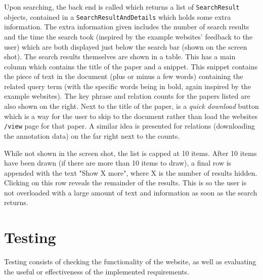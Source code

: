 Upon searching, the back end is called which returns a list of \texttt{SearchResult} objects, contained in a \texttt{SearchResultAndDetails} which holds some extra information. The extra information given includes the number of search results and the time the search took (inspired by the example websites' feedback to the user) which are both displayed just below the search bar (shown on the screen shot). The search results themselves are shown in a table. This has a main column which contains the title of the paper and a snippet. This snippet contains the piece of text in the document (plus or minus a few words) containing the related query term (with the specific words being in bold, again inspired by the example websites). The key phrase and relation counts for the papers listed are also shown on the right. Next to the title of the paper, is a \textit{quick download} button which is a way for the user to skip to the document rather than load the websites \texttt{/view} page for that paper. A similar idea is presented for relations (downloading the annotation data) on the far right next to the counts.

While not shown in the screen shot, the list is capped at 10 items. After 10 items have been drawn (if there are more than 10 items to draw), a final row is appended with the text "Show X more", where X is the number of results hidden. Clicking on this row reveals the remainder of the results. This is so the user is not overloaded with a large amount of text and information as soon as the search returns. 

\section{Testing}
Testing consists of checking the functionality of the website, as well as evaluating the useful or effectiveness of the implemented requirements.

